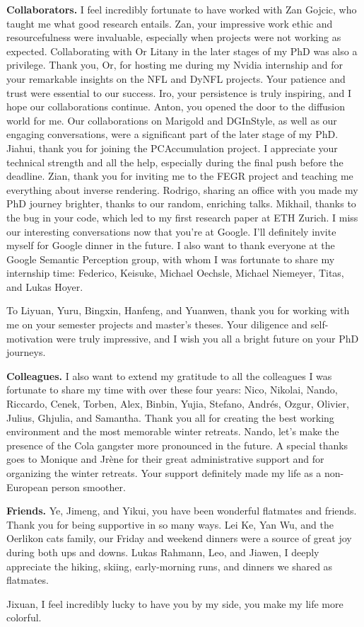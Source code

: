 \noindent
\textbf{Collaborators.}
I feel incredibly fortunate to have worked with Zan Gojcic, who taught me what good research entails. Zan, your impressive work ethic and resourcefulness were invaluable, especially when projects were not working as expected. Collaborating with Or Litany in the later stages of my PhD was also a privilege. Thank you, Or, for hosting me during my Nvidia internship and for your remarkable insights on the NFL and DyNFL projects. Your patience and trust were essential to our success. Iro, your persistence is truly inspiring, and I hope our collaborations continue. Anton, you opened the door to the diffusion world for me. Our collaborations on Marigold and DGInStyle, as well as our engaging conversations, were a significant part of the later stage of my PhD. Jiahui, thank you for joining the PCAccumulation project. I appreciate your technical strength and all the help, especially during the final push before the deadline. Zian, thank you for inviting me to the FEGR project and teaching me everything about inverse rendering.  Rodrigo, sharing an office with you made my PhD journey brighter, thanks to our random, enriching talks. Mikhail, thanks to the bug in your code, which led to my first research paper at ETH Zurich. I miss our interesting conversations now that you're at Google. I'll definitely invite myself for Google dinner in the future. I also want to thank everyone at the Google Semantic Perception group, with whom I was fortunate to share my internship time: Federico, Keisuke, Michael Oechsle, Michael Niemeyer, Titas, and Lukas Hoyer.

To Liyuan, Yuru, Bingxin, Hanfeng, and Yuanwen, thank you for working with me on your semester projects and master's theses. Your diligence and self-motivation were truly impressive, and I wish you all a bright future on your PhD journeys.

\noindent
\textbf{Colleagues.}
I also want to extend my gratitude to all the colleagues I was fortunate to share my time with over these four years: Nico, Nikolai, Nando, Riccardo, Cenek, Torben, Alex, Binbin, Yujia, Stefano, Andrés, Ozgur, Olivier, Julius, Ghjulia, and Samantha. Thank you all for creating the best working environment and the most memorable winter retreats. Nando, let's make the presence of the Cola gangster more pronounced in the future. A special thanks goes to Monique and Jrène for their great administrative support and for organizing the winter retreats. Your support definitely made my life as a non-European person smoother. 

\noindent
\textbf{Friends.}
Ye, Jimeng, and Yikui, you have been wonderful flatmates and friends. Thank you for being supportive in so many ways. Lei Ke, Yan Wu, and the Oerlikon cats family, our Friday and weekend dinners were a source of great joy during both ups and downs. Lukas Rahmann, Leo, and Jiawen, I deeply appreciate the hiking, skiing, early-morning runs, and dinners we shared as flatmates.

Jixuan, I feel incredibly lucky to have you by my side, you make my life more colorful.